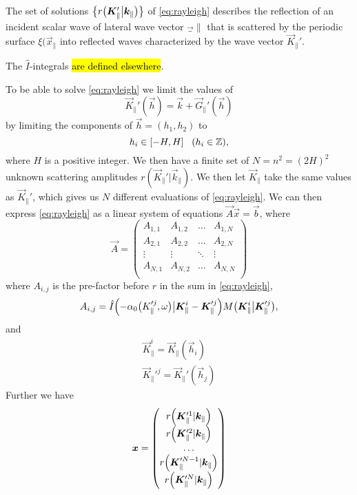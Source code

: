 The set of solutions $\cbr[1]{r\del[1]{\vec K_{\|}'\big\vert \vec k_{\|}}}$ of \cref{eq:rayleigh} describes the reflection of an incident scalar wave of lateral wave vector $\vec_\|$ that is scattered by the periodic surface $\xi(\vec x_\|$ into reflected waves characterized by the wave vector $\vec K_\|'$.

The $\hat I$-integrals \hl{are defined elsewhere}.

To be able to solve \cref{eq:rayleigh} we limit the values of
\begin{equation}
    \vec K_{\|}'(\vec h) = \vec k + \vec G_\|'(\vec h)
\end{equation}
by limiting the components of $\vec h = (h_1, h_2)$ to
\begin{equation}
    h_i \in \sbr{-H, H} ~~(h_i \in \mathbb{Z}),
\end{equation}
where $H$ is a positive integer. We then have a finite set of $N = n^2 = (2H)^2$ unknown scattering amplitudes $r(\vec K_\|' \big\vert \vec k_\|)$. We then let $\vec K_\|$ take the same values as $\vec K_\|'$, which gives us $N$ different evaluations of \cref{eq:rayleigh}. We can then express \cref{eq:rayleigh} as a linear system of equations $\vec A \vec x = \vec b$, where
\begin{equation}
    \vec A =
    \begin{pmatrix}
        A_{1,1} & A_{1,2} & \dots  & A_{1,N} \\
        A_{2,1} & A_{2,2} & \dots  & A_{2,N} \\
        \vdots  & \vdots  & \ddots & \vdots  \\
        A_{N,1} & A_{N,2} & \dots  & A_{N,N} \\
    \end{pmatrix}
\end{equation}
where $A_{i, j}$ is the pre-factor before $r$ in the sum in \cref{eq:rayleigh},
\begin{equation}
    A_{i, j} = \hat I\del[2]{-\alpha_0 \del[1]{K_{\|}'^j, \omega} \big\vert \vec K_{\|}^i - \vec K_{\|}'^j} M\del[1]{\vec K_{\|}^i \big\vert \vec K_{\|}'^j},
\end{equation}
and
\begin{align}
    \vec K_\|^{i} = \vec K_\| (\vec h_i) \\
    \vec K_\|'^{j} = \vec K_\|' (\vec h_j)
\end{align}
Further we have
\begin{equation}
    \vec x =
    \begin{pmatrix}
        r\del[2]{\vec K_\|'^{1} \vert \vec k_\|} \\
        r\del[2]{\vec K_\|'^{2} \vert \vec k_\|} \\
        \hdots \\
        r\del[2]{\vec K_\|'^{N-1} \vert \vec k_\|} \\
        r\del[2]{\vec K_\|'^{N} \vert \vec k_\|}
    \end{pmatrix}
\end{equation}
